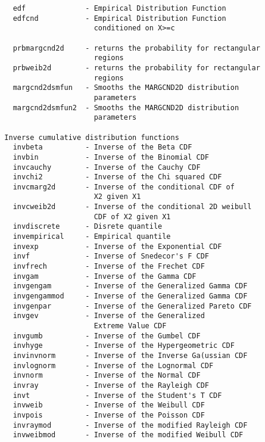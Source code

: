 {\begin{verbatim}
    edf              - Empirical Distribution Function
    edfcnd           - Empirical Distribution Function
                       conditioned on X>=c

    prbmargcnd2d     - returns the probability for rectangular
                       regions
    prbweib2d        - returns the probability for rectangular
                       regions
    margcnd2dsmfun   - Smooths the MARGCND2D distribution
                       parameters
    margcnd2dsmfun2  - Smooths the MARGCND2D distribution
                       parameters

  Inverse cumulative distribution functions
    invbeta          - Inverse of the Beta CDF
    invbin           - Inverse of the Binomial CDF
    invcauchy        - Inverse of the Cauchy CDF
    invchi2          - Inverse of the Chi squared CDF
    invcmarg2d       - Inverse of the conditional CDF of
                       X2 given X1
    invcweib2d       - Inverse of the conditional 2D weibull
                       CDF of X2 given X1
    invdiscrete      - Disrete quantile
    invempirical     - Empirical quantile
    invexp           - Inverse of the Exponential CDF
    invf             - Inverse of Snedecor's F CDF
    invfrech         - Inverse of the Frechet CDF
    invgam           - Inverse of the Gamma CDF
    invgengam        - Inverse of the Generalized Gamma CDF
    invgengammod     - Inverse of the Generalized Gamma CDF
    invgenpar        - Inverse of the Generalized Pareto CDF
    invgev           - Inverse of the Generalized
                       Extreme Value CDF
    invgumb          - Inverse of the Gumbel CDF
    invhyge          - Inverse of the Hypergeometric CDF
    invinvnorm       - Inverse of the Inverse Ga(ussian CDF
    invlognorm       - Inverse of the Lognormal CDF
    invnorm          - Inverse of the Normal CDF
    invray           - Inverse of the Rayleigh CDF
    invt             - Inverse of the Student's T CDF
    invweib          - Inverse of the Weibull CDF
    invpois          - Inverse of the Poisson CDF
    invraymod        - Inverse of the modified Rayleigh CDF
    invweibmod       - Inverse of the modified Weibull CDF


\end{verbatim}}
